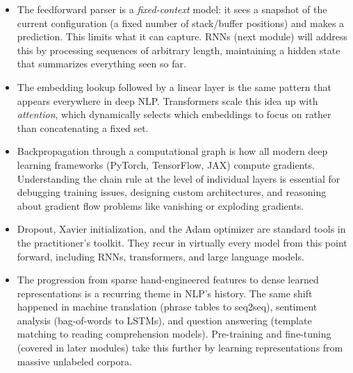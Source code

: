 \documentclass[11pt]{article}
\begin{document}
\begin{itemize}[nosep, leftmargin=*]
\item The feedforward parser is a \textit{fixed-context} model: it sees a snapshot of the current configuration (a fixed number of stack/buffer positions) and makes a prediction. This limits what it can capture. RNNs (next module) will address this by processing sequences of arbitrary length, maintaining a hidden state that summarizes everything seen so far.
\item The embedding lookup followed by a linear layer is the same pattern that appears everywhere in deep NLP. Transformers scale this idea up with \textit{attention}, which dynamically selects which embeddings to focus on rather than concatenating a fixed set.
\item Backpropagation through a computational graph is how all modern deep learning frameworks (PyTorch, TensorFlow, JAX) compute gradients. Understanding the chain rule at the level of individual layers is essential for debugging training issues, designing custom architectures, and reasoning about gradient flow problems like vanishing or exploding gradients.
\item Dropout, Xavier initialization, and the Adam optimizer are standard tools in the practitioner's toolkit. They recur in virtually every model from this point forward, including RNNs, transformers, and large language models.
\item The progression from sparse hand-engineered features to dense learned representations is a recurring theme in NLP's history. The same shift happened in machine translation (phrase tables to seq2seq), sentiment analysis (bag-of-words to LSTMs), and question answering (template matching to reading comprehension models). Pre-training and fine-tuning (covered in later modules) take this further by learning representations from massive unlabeled corpora.
\end{itemize}
\end{document}
